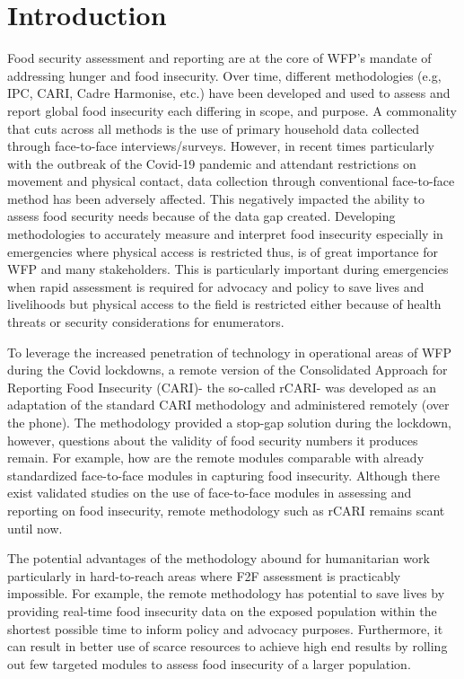 \documentclass[11pt,harvard]{article}
\begin{document}
	\pagebreak
	
	\section{Introduction}
	
	Food security assessment and reporting are at the core of WFP’s mandate of addressing hunger and food insecurity. Over time, different methodologies (e.g, IPC, CARI, Cadre Harmonise, etc.) have been developed and used to assess and report global food insecurity each differing in scope, and purpose. A commonality that cuts across all methods is the use of primary household data collected through face-to-face interviews/surveys. However, in recent times particularly with the outbreak of the Covid-19 pandemic and attendant restrictions on movement and physical contact, data collection through conventional face-to-face method has been adversely affected. This negatively impacted the ability to assess food security needs because of the data gap created. Developing methodologies to accurately measure and interpret food insecurity especially in emergencies where physical access is restricted thus, is of great importance for WFP and many stakeholders. This is particularly important during emergencies when rapid assessment is required for advocacy and policy to save lives and livelihoods but physical access to the field is restricted either because of health threats or security considerations for enumerators. 
	
	To leverage the increased penetration of technology in operational areas of WFP during the Covid lockdowns, a remote version of the Consolidated Approach for Reporting Food Insecurity (CARI)- the so-called rCARI- was developed as an adaptation of the standard CARI methodology and administered remotely (over the phone). The methodology provided a stop-gap solution during the lockdown, however, questions about the validity of food security numbers it produces remain. For example, how are the remote modules comparable with already standardized face-to-face modules in capturing food insecurity. Although there exist validated studies on the use of face-to-face modules in assessing and reporting on food insecurity, remote methodology such as rCARI remains scant until now. 
	
	The potential advantages of the methodology abound for humanitarian work particularly in hard-to-reach areas where F2F assessment is practicably impossible. For example, the remote methodology has potential to save lives by providing real-time food insecurity data on the exposed population within the shortest possible time to inform policy and advocacy purposes. Furthermore, it can result in better use of scarce resources to achieve high end results by rolling out few targeted modules to assess food insecurity of a larger population.  	
	
\end{document}
